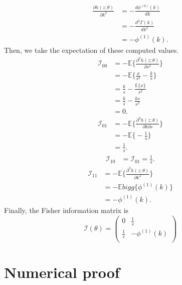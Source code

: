 \documentclass[final]{aomart}
\newtheorem[{}\it]{thm}{Theorem}[section]
\theoremstyle{definition}
\newtheorem*[{}\it]{notation}{Notation}
\numberwithin{equation}{section}
\newcommand{\fisher}{\mathcal{I}} %
\begin{document}
\begin{equation}
	\begin{aligned}
	\frac{\partial h(z; \theta)}{\partial k^2} & = -\frac{d\phi^{(0)}(k)}{dk}\\
															   & = -\frac{d^2\Gamma(k)}{dk^2}\\
															   & = -\phi^{(1)}(k).
	\end{aligned}
	\label{11}
\end{equation}
Then, we take the expectation of these computed values.
\begin{equation}
	\begin{aligned}
	\fisher_{00} & = -\mathbb{E}\bigg\{ \frac{\partial^2 h(z;\theta)}{\partial s^2} \bigg\}\\
					   & = -\mathbb{E}\bigg\{ \frac{x}{s^2} - \frac{k}{s} \bigg\}\\
					   & = \frac{k}{s} - \frac{\mathbb{E}\{ x \}}{s^2}\\
					   & = \frac{k}{s} - \frac{ks}{s^2}\\
					   & = 0.
	\end{aligned}
\end{equation}
\begin{equation}
	\begin{aligned}
	\fisher_{01} & = -\mathbb{E}\bigg\{ \frac{\partial^2 h(z;\theta)}{\partial k\partial s} \bigg\}\\
					  & = -\mathbb{E}\bigg\{ -\frac{1}{s} \bigg\}\\
					  & = \frac{1}{s}.
	\end{aligned}
\end{equation}
\begin{equation}
	\begin{aligned}
	\fisher_{10} & = \fisher_{01} = \frac{1}{s}.
	\end{aligned}
\end{equation}
\begin{equation}
	\begin{aligned}
	\fisher_{11} & = -\mathbb{E}\bigg\{ \frac{\partial^2 h(z;\theta)}{\partial k^2} \bigg\}\\
					  & = -\mathbb{E}bigg\{ \phi^{(1)}(k) \bigg\}\\
					  & = -\phi^{(1)}(k).
	\end{aligned}
\end{equation}
Finally, the Fisher information matrix is 
\[ \fisher(\theta) = \left( \begin{array}{cc}
	0 & \frac{1}{s} \\
	\frac{1}{s} & -\phi^{(1)}(k) \\
	 \end{array} \right)\] 
\section{Numerical proof}


\end{document}
